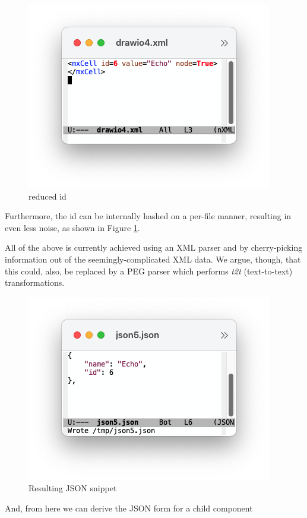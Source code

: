 \documentclass[10pt,anonymous,review]{acmart}
\begin{document}
\begin{figure}
   \centering
    \includegraphics[trim=1cm 1.9cm 1cm 1cm, clip, scale=0.4]{./media/drawio4.png}
    \caption{reduced id}
    \label{drawio4}
\end{figure}
Furthermore, the id can be internally hashed on a per-file manner, resulting in even less noise, as shown in Figure \ref{drawio4}.

 \vspace{6\baselineskip}

All of the above is currently achieved using an XML parser and by cherry-picking information out of
the seemingly-complicated XML data. We argue, though, that this could, also, be replaced
by a PEG parser which performs \emph{t2t} (text-to-text) transformations.

\begin{figure}
    \centering
    \includegraphics[trim=1cm 1.7cm 1cm 1cm, clip, scale=0.4]{./media/json5.png}
    \caption{Resulting JSON snippet}
    \label{json5}
\end{figure}
\vspace{0.5\baselineskip}
And, from here we can derive the JSON form for a child component
\end{document}
